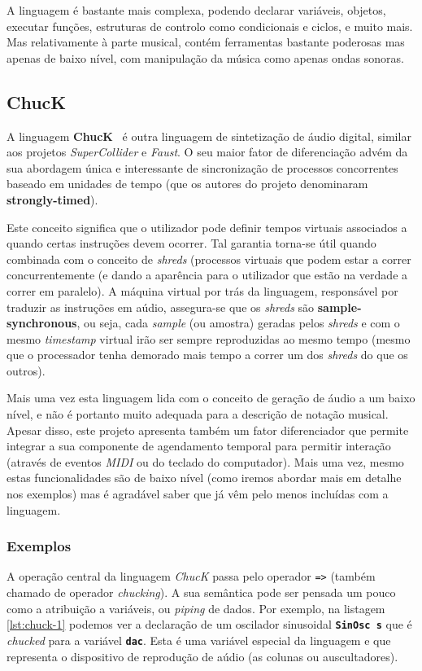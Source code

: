 A linguagem é bastante mais complexa, podendo declarar variáveis, objetos, executar funções, estruturas de controlo como condicionais e ciclos, e muito mais. Mas relativamente à parte musical, contém ferramentas bastante poderosas mas apenas de baixo nível, com manipulação da música como apenas ondas sonoras.

\subsection{ChucK}
A linguagem \textbf{ChucK}~\cite{doi:Chuck} é outra linguagem de sintetização de áudio digital, similar aos projetos \textit{SuperCollider} e \textit{Faust}. O seu maior fator de diferenciação advém da sua abordagem única e interessante de sincronização de processos concorrentes baseado em unidades de tempo (que os autores do projeto denominaram \textbf{strongly-timed}).

Este conceito significa que o utilizador pode definir tempos virtuais associados a quando certas instruções devem ocorrer. Tal garantia torna-se útil quando combinada com o conceito de \textit{shreds} (processos virtuais que podem estar a correr concurrentemente (e dando a aparência para o utilizador que estão na verdade a correr em paralelo). A máquina virtual por trás da linguagem, responsável por traduzir as instruções em aúdio, assegura-se que os \textit{shreds} são \textbf{sample-synchronous}, ou seja, cada \textit{sample} (ou amostra) geradas pelos \textit{shreds} e com o mesmo \textit{timestamp} virtual irão ser sempre reproduzidas ao mesmo tempo (mesmo que o processador tenha demorado mais tempo a correr um dos \textit{shreds} do que os outros). 

Mais uma vez esta linguagem lida com o conceito de geração de áudio a um baixo nível, e não é portanto muito adequada para a descrição de notação musical. Apesar disso, este projeto apresenta também um fator diferenciador que permite integrar a sua componente de agendamento temporal para permitir interação (através de eventos \textit{MIDI} ou do teclado do computador). Mais uma vez, mesmo estas funcionalidades são de baixo nível (como iremos abordar mais em detalhe nos exemplos) mas é agradável saber que já vêm pelo menos incluídas com a linguagem.

\subsubsection{Exemplos}
A operação central da linguagem \textit{ChucK} passa pelo operador \texttt{=>} (também chamado de operador \textit{chucking}). A sua semântica pode ser pensada um pouco como a atribuição a variáveis, ou \textit{piping} de dados. Por exemplo, na listagem \ref{lst:chuck-1} podemos ver a declaração de um oscilador sinusoidal \textbf{\texttt{SinOsc s}} que é \textit{chucked} para a variável \textbf{\texttt{dac}}. Esta é uma variável especial da linguagem e que representa o dispositivo de reprodução de aúdio (as colunas ou auscultadores).

